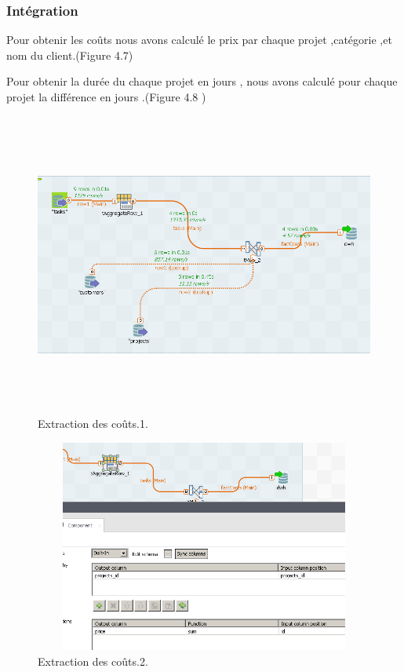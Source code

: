 \subsubsection{Int\'{e}gration}


Pour obtenir les co\^{u}ts nous avons calcul\'{e} le prix par chaque projet
,cat\'{e}gorie ,et nom du client.(Figure  4.7)

Pour obtenir la dur\'{e}e du chaque projet en jours ,
nous avons calcul\'{e} pour chaque projet la diff\'{e}rence en jours .(Figure 4.8 )

\begin{figure}[H]
\center
\includegraphics[width=14cm,height=10cm]{./figures/integ.png}
\caption{Extraction des co\^{u}ts.1.}
\end{figure}



\begin{figure}[H]
\center
\includegraphics[width=12cm,height=7cm]{./figures/integ1.png}
\caption{Extraction des co\^{u}ts.2.}
\end{figure}







